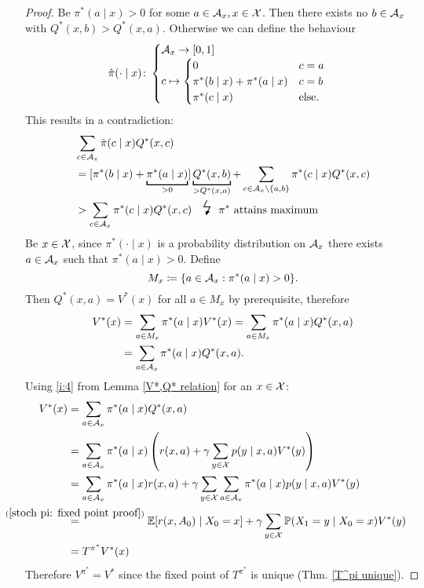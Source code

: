 \begin{proof}
	\xToy{\ref{ii:3}}{\ref{ii:4}} 
	Be \(\pi^*(a\mid x)>0\) for some \(a\in\mathcal{A}_x,x\in\mathcal{X}\). Then there exists no \(b\in\mathcal{A}_x\) with \(Q^*(x,b)>Q^*(x,a)\). Otherwise we can define the behaviour
	\[
		\hat{\pi}(\cdot\mid x)\colon
		\begin{cases}
			\mathcal{A}_x\to[0,1]\\
			c\mapsto 
			\begin{cases}
				0 & c=a \\
				\pi^*(b\mid x) + \pi^*(a\mid x) & c=b\\
				\pi^*(c\mid x) & \text{else}.
			\end{cases}
		\end{cases}
	\]
	This results in a contradiction:
	\begin{align*}
		&\sum_{c\in\cA_x} \hat{\pi}(c\mid x) Q^*(x,c)\\
		&=[\pi^*(b\mid x) %
		+ \underbracket[1pt]{\pi^*(a\mid x)}_{>0}] \underbracket[1pt]{Q^*(x,b)}_{>Q^*(x,a)}
		+\sum_{c\in\cA_x\setminus \{a,b\}} \pi^*(c\mid x)Q^*(x,c)\\
		&> \sum_{c\in\cA_x} \pi^*(c\mid x) Q^*(x,c) \contradiction{\pi^* \text{ attains maximum}}
	\end{align*}
	\xToy{\ref{ii:4}}{\ref{ii:2}} Be \(x\in\mathcal{X}\), since \(\pi^*(\cdot\mid x)\) is a probability distribution on \(\mathcal{A}_x\) there exists \(a\in\mathcal{A}_x\) such that \(\pi^*(a\mid x)>0\). Define
	\[
		M_x\coloneqq \{a\in\mathcal{A}_x:\pi^*(a\mid x)>0 \}.
	\]
	Then \(Q^*(x,a)=V^*(x)\) for all \(a\in M_x\) by prerequisite, therefore
	\begin{align*}
		V^*(x)&= \sum_{a\in M_x} \pi^*(a\mid x) V^*(x) 
		= \sum_{a\in M_x} \pi^*(a\mid x)Q^*(x,a)\\
		&=\sum_{a\in \mathcal{A}_x} \pi^*(a\mid x)Q^*(x,a).
	\end{align*}
	\xToy{\ref{ii:2}}{\ref{ii:1}} Using \ref{i:4} from Lemma \ref{V*,Q* relation} for an \(x\in\mathcal{X}\):
	\begin{align*}
		V^*(x)&=\sum_{a\in \cA_x} \pi^*(a\mid x)Q^*(x,a)\\
		&=\sum_{a\in \cA_x} \pi^*(a\mid x) 
		\left(r(x,a)+\gamma \sum\limits_{y\in\cX}p(y\mid x,a) V^*(y)\right)\\
		&=\sum_{a\in \cA_x}\pi^*(a\mid x)r(x,a)
		+\gamma \sum_{y\in\cX} \sum_{a\in\cA_x}\pi^*(a\mid x)p(y\mid x,a)V^*(y)\\
		&\lxeq{(\ref{stoch pi: fixed point proof})}\E[r(x,A_0)\mid X_0=x] 
		+ \gamma \sum_{y\in\cX}\Pr(X_1=y\mid X_0 =x) V^*(y)\\
		&=T^{\pi^*} V^*(x)
	\end{align*}
	Therefore \(V^{\pi^*} = V^*\) since the fixed point of \(T^{\pi^*}\) is unique (Thm. \ref{T^pi unique}).
\end{proof}

